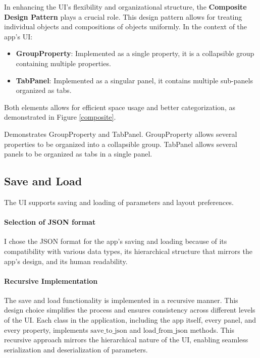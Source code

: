 In enhancing the UI's flexibility and organizational structure, the \textbf{Composite Design Pattern} plays a crucial role. This design pattern allows for treating individual objects and compositions of objects uniformly. In the context of the app's UI:

\begin{itemize}
    \item \textbf{GroupProperty}: Implemented as a single property, it is a collapsible group containing multiple properties.
    \item \textbf{TabPanel}: Implemented as a singular panel, it contains multiple sub-panels organized as tabs. 
\end{itemize}

Both elements allows for efficient space usage and better categorization, as demonstrated in Figure \ref{composite}.

{Demonstrates GroupProperty and TabPanel. GroupProperty allows several properties to be organized into a collapsible group. TabPanel allows several panels to be organized as tabs in a single panel.}

\subsection{Save and Load}

The UI supports saving and loading of parameters and layout preferences.

\paragraph{Selection of JSON format}
I chose the JSON format for the app's saving and loading because of its compatibility with various data types, its hierarchical structure that mirrors the app's design, and its human readability.

\paragraph{Recursive Implementation}
The save and load functionality is implemented in a recursive manner. This design choice simplifies the process and ensures consistency across different levels of the UI. Each class in the application, including the app itself, every panel, and every property, implements $\text{save\_to\_json}$ and $\text{load\_from\_json}$ methods. This recursive approach mirrors the hierarchical nature of the UI, enabling seamless serialization and deserialization of parameters.

